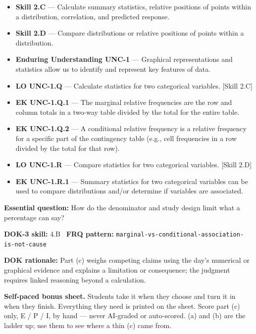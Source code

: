 \documentclass[11pt]{article}
\begin{document}


{\small
\begin{itemize}[leftmargin=1.5em,itemsep=2pt,topsep=2pt]
  \item \textbf{Skill 2.C} --- Calculate summary statistics, relative positions of points within a distribution, correlation, and predicted response.
  \item \textbf{Skill 2.D} --- Compare distributions or relative positions of points within a distribution.
  \item \textbf{Enduring Understanding UNC-1} --- Graphical representations and statistics allow us to identify and represent key features of data.
  \item \textbf{LO UNC-1.Q} --- Calculate statistics for two categorical variables. [Skill 2.C]
  \item \textbf{EK UNC-1.Q.1} --- The marginal relative frequencies are the row and column totals in a two-way table divided by the total for the entire table.
  \item \textbf{EK UNC-1.Q.2} --- A conditional relative frequency is a relative frequency for a specific part of the contingency table (e.g., cell frequencies in a row divided by the total for that row).
  \item \textbf{LO UNC-1.R} --- Compare statistics for two categorical variables. [Skill 2.D]
  \item \textbf{EK UNC-1.R.1} --- Summary statistics for two categorical variables can be used to compare distributions and/or determine if variables are associated.
\end{itemize}
}
\textbf{Essential question:} How do the denominator and study design limit what a percentage can say?\par
\textbf{DOK-3 skill:} 4.B \textperiodcentered\ \textbf{FRQ pattern:} {\small\texttt{marginal-\allowbreak{}vs-\allowbreak{}conditional-\allowbreak{}association-\allowbreak{}is-\allowbreak{}not-\allowbreak{}cause}}\par
\textbf{DOK rationale:} Part (c) weighs competing claims using the day's numerical or graphical evidence and explains a limitation or consequence; the judgment requires linked reasoning beyond a calculation.\par

\textbf{Self-paced bonus sheet.} Students take it when they choose and turn it in when they finish. Everything they need is printed on the sheet. Score part (c) only, E / P / I, by hand --- never AI-graded or auto-scored. (a) and (b) are the ladder up; use them to see where a thin (c) came from.\par
\end{document}
